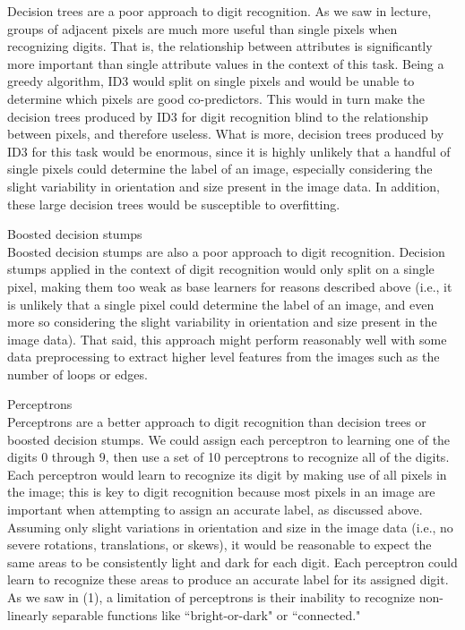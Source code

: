 \documentclass[solution, letterpaper]{cs121}
\begin{document}
Decision trees are a poor approach to digit recognition. As we saw in lecture, groups of adjacent pixels are much more useful than single pixels when recognizing digits. That is, the relationship between attributes is significantly more important than single attribute values in the context of this task. Being a greedy algorithm, ID3 would split on single pixels and would be unable to determine which pixels are good co-predictors. This would in turn make the decision trees produced by ID3 for digit recognition blind to the relationship between pixels, and therefore useless. What is more, decision trees produced by ID3 for this task would be enormous, since it is highly unlikely that a handful of single pixels could determine the label of an image, especially considering the slight variability in orientation and size present in the image data. In addition, these large decision trees would be susceptible to overfitting.

\subproblem Boosted decision stumps \\

Boosted decision stumps are also a poor approach to digit recognition. Decision stumps applied in the context of digit recognition would only split on a single pixel, making them too weak as base learners for reasons described above (i.e., it is unlikely that a single pixel could determine the label of an image, and even more so considering the slight variability in orientation and size present in the image data). That said, this approach might perform reasonably well with some data preprocessing to extract higher level features from the images such as the number of loops or edges.

\subproblem Perceptrons \\

Perceptrons are a better approach to digit recognition than decision trees or boosted decision stumps. We could assign each perceptron to learning one of the digits $0$ through $9$, then use a set of 10 perceptrons to recognize all of the digits. Each perceptron would learn to recognize its digit by making use of all pixels in the image; this is key to digit recognition because most pixels in an image are important when attempting to assign an accurate label, as discussed above. Assuming only slight variations in orientation and size in the image data (i.e., no severe rotations, translations, or skews), it would be reasonable to expect the same areas to be consistently light and dark for each digit. Each perceptron could learn to recognize these areas to produce an accurate label for its assigned digit. As we saw in (1), a limitation of perceptrons is their inability to recognize non-linearly separable functions like ``bright-or-dark" or ``connected."
\end{document}
